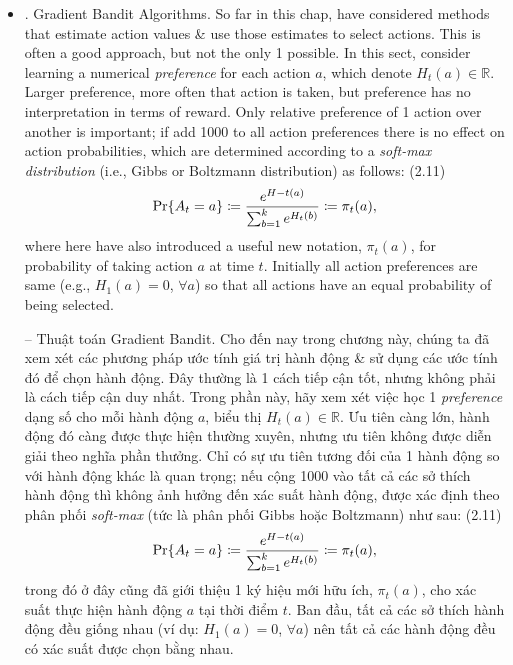\documentclass{article}
\newtheorem{problem}{Problem}
\begin{document}
\begin{itemize}
\begin{itemize}
\begin{problem}[UCB Spikes]
            -- Trong Hình 2.4, thuật toán UCB cho thấy hiệu suất tăng đột biến rõ rệt ở bước thứ 11. Tại sao vậy? Lưu ý: để câu trả lời của bạn được coi là hoàn toàn thỏa đáng, bạn phải giải thích được cả lý do tại sao phần thưởng tăng ở bước thứ 11 \& tại sao nó giảm ở các bước tiếp theo. Nếu $c = 1$, thì sự tăng đột biến sẽ ít rõ rệt hơn.
        \end{problem}
        \item {. Gradient Bandit Algorithms.} So far in this chap, have considered methods that estimate action values \& use those estimates to select actions. This is often a good approach, but not the only 1 possible. In this sect, consider learning a numerical {\it preference} for each action $a$, which denote $H_t(a)\in\mathbb{R}$. Larger preference, more often that action is taken, but preference has no interpretation in terms of reward. Only relative preference of 1 action over another is important; if add 1000 to all action preferences there is no effect on action probabilities, which are determined according to a {\it soft-max distribution} (i.e., Gibbs or Boltzmann distribution) as follows: (2.11)
        \begin{equation*}
            {\rm Pr}\{A_t = a\}\coloneqq\frac{e^{H-t(a)}}{\sum_{b=1}^k e^{H_t(b)}}\coloneqq\pi_t(a),
        \end{equation*}
        where here have also introduced a useful new notation, $\pi_t(a)$, for probability of taking action $a$ at time $t$. Initially all action preferences are same (e.g., $H_1(a) = 0$, $\forall a$) so that all actions have an equal probability of being selected.

        -- {\sf Thuật toán Gradient Bandit.} Cho đến nay trong chương này, chúng ta đã xem xét các phương pháp ước tính giá trị hành động \& sử dụng các ước tính đó để chọn hành động. Đây thường là 1 cách tiếp cận tốt, nhưng không phải là cách tiếp cận duy nhất. Trong phần này, hãy xem xét việc học 1 {\it preference} dạng số cho mỗi hành động $a$, biểu thị $H_t(a)\in\mathbb{R}$. Ưu tiên càng lớn, hành động đó càng được thực hiện thường xuyên, nhưng ưu tiên không được diễn giải theo nghĩa phần thưởng. Chỉ có sự ưu tiên tương đối của 1 hành động so với hành động khác là quan trọng; nếu cộng 1000 vào tất cả các sở thích hành động thì không ảnh hưởng đến xác suất hành động, được xác định theo phân phối {\it soft-max} (tức là phân phối Gibbs hoặc Boltzmann) như sau: (2.11)
        \begin{equation*}
            {\rm Pr}\{A_t = a\}\coloneqq\frac{e^{H-t(a)}}{\sum_{b=1}^k e^{H_t(b)}}\coloneqq\pi_t(a),
        \end{equation*}
        trong đó ở đây cũng đã giới thiệu 1 ký hiệu mới hữu ích, $\pi_t(a)$, cho xác suất thực hiện hành động $a$ tại thời điểm $t$. Ban đầu, tất cả các sở thích hành động đều giống nhau (ví dụ: $H_1(a) = 0$, $\forall a$) nên tất cả các hành động đều có xác suất được chọn bằng nhau.


\end{itemize}
\end{itemize}
\end{document}
